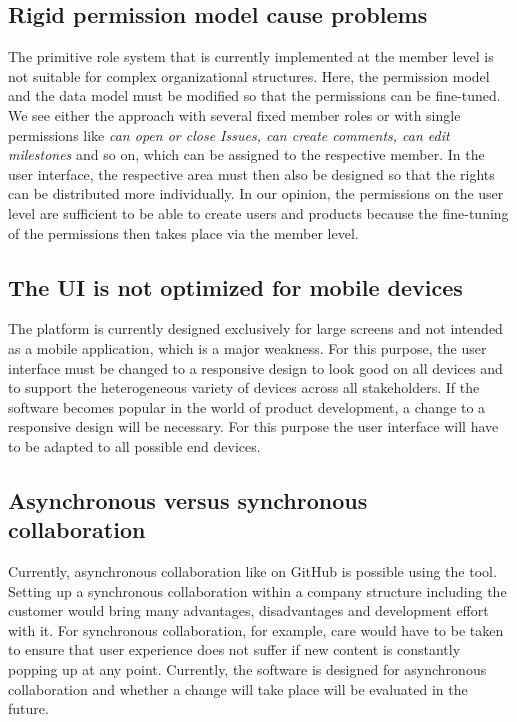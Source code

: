 \subsection*{Rigid permission model cause problems}
The primitive role system that is currently implemented at the member level is not suitable for complex organizational structures. Here, the permission model and the data model must be modified so that the permissions can be fine-tuned. We see either the approach with several fixed member roles or with single permissions like \textit{can open or close Issues, can create comments, can edit milestones} and so on, which can be assigned to the respective member. In the user interface, the respective area must then also be designed so that the rights can be distributed more individually. In our opinion, the permissions on the user level are sufficient to be able to create users and products because the fine-tuning of the permissions then takes place via the member level.

\subsection*{The UI is not optimized for mobile devices}
The platform is currently designed exclusively for large screens and not intended as a mobile application, which is a major weakness. For this purpose, the user interface must be changed to a responsive design to look good on all devices and to support the heterogeneous variety of devices across all stakeholders. If the software becomes popular in the world of product development, a change to a responsive design will be necessary. For this purpose the user interface will have to be adapted to all possible end devices.


\subsection*{Asynchronous versus synchronous collaboration}
Currently, asynchronous collaboration like on GitHub is possible using the tool. Setting up a synchronous collaboration within a company structure including the customer would bring many advantages, disadvantages and development effort with it. For synchronous collaboration, for example, care would have to be taken to ensure that user experience does not suffer if new content is constantly popping up at any point. Currently, the software is designed for asynchronous collaboration and whether a change will take place will be evaluated in the future.


